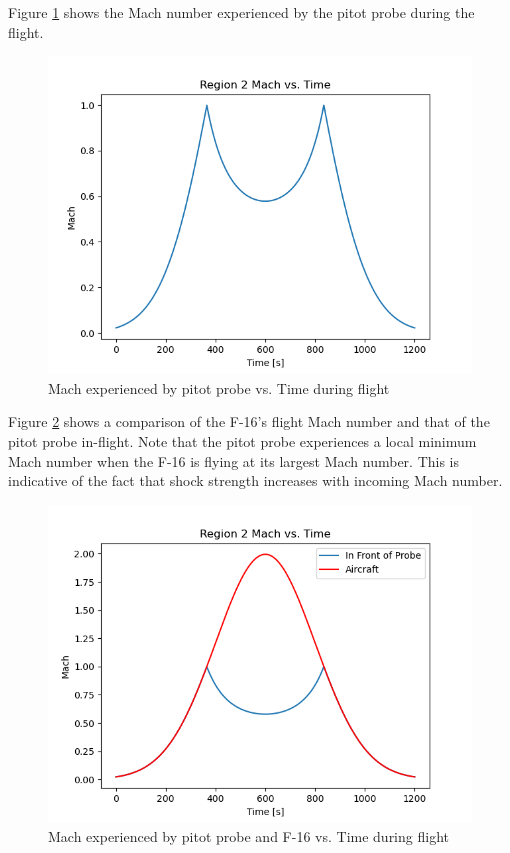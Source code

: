 \documentclass[../main.tex]{subfiles}
\begin{document}
Figure \ref{MvsT_probe} shows the Mach number experienced by the pitot probe during the flight.

\begin{figure}[h]
    \centering
    \includegraphics[scale=.7]{../images/problem_2/Mach_vs_Time_F16_Probe.png}
    \caption{Mach experienced by pitot probe vs. Time during flight}
    \label{MvsT_probe}
\end{figure}

Figure \ref{MvsT_probe_aircraft} shows a comparison of the F-16's flight Mach number and that of the pitot probe in-flight.
Note that the pitot probe experiences a local minimum Mach number when the F-16 is flying at its largest Mach number.
This is indicative of the fact that shock strength increases with incoming Mach number.

\begin{figure}[h]
    \centering
    \includegraphics[scale=.7]{../images/problem_2/Mach_vs_Time_F16_Probe_Aircraft.png}
    \caption{Mach experienced by pitot probe and F-16 vs. Time during flight}
    \label{MvsT_probe_aircraft}
\end{figure}
\end{document}

